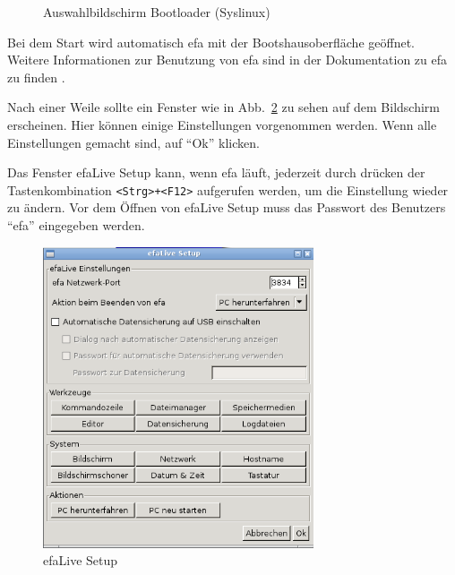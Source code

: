 \documentclass[a4paper,12pt,twoside]{article}
\begin{document}
\begin{figure}
    \centering
    \caption{Auswahlbildschirm Bootloader (Syslinux)}
    \label{fig:syslinux}
\end{figure}

Bei dem Start wird automatisch efa mit der Bootshausoberfläche geöffnet.
Weitere Informationen zur Benutzung von efa sind in der Dokumentation
zu efa zu finden \cite{EFA2}.

Nach einer Weile sollte ein Fenster wie in Abb.~\ref{fig:efalivesetup_live} zu
sehen auf dem Bildschirm erscheinen. Hier können einige Einstellungen vorgenommen
werden. Wenn alle Einstellungen gemacht sind, auf "`Ok"' klicken.

Das Fenster efaLive Setup kann, wenn efa läuft, jederzeit durch drücken
der Tastenkombination \texttt{{\textless}Strg{\textgreater}+{\textless}F12{\textgreater}} 
aufgerufen
werden, um die Einstellung wieder zu ändern. Vor dem Öffnen von efaLive
Setup muss das Passwort des Benutzers "`efa"' eingegeben werden.

\begin{figure}
    \centering
    \includegraphics[width=8cm]{efaLivede-img/efaLive_efaLiveSetup_de.png}
    \caption{efaLive Setup}
    \label{fig:efalivesetup_live}
\end{figure}
\end{document}
